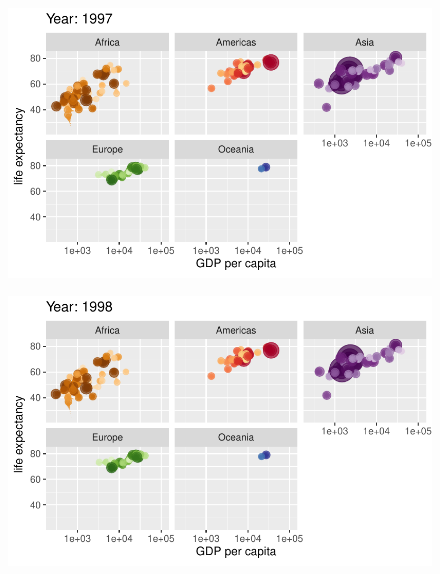 \documentclass[
  letterpaper,
  DIV=11,
  numbers=noendperiod]{scrartcl}
\begin{document}
\begin{figure}[H]

{\centering \includegraphics{class05_files/figure-pdf/unnamed-chunk-24-82.pdf}

}

\end{figure}

\begin{figure}[H]

{\centering \includegraphics{class05_files/figure-pdf/unnamed-chunk-24-83.pdf}

}

\end{figure}
\end{document}
